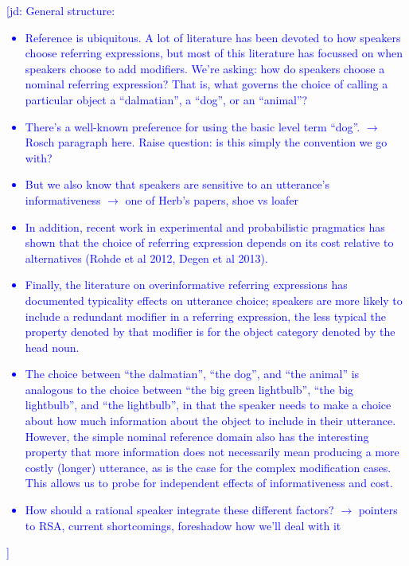 \documentclass[10pt,letterpaper]{article}
\newcommand{\jd}[1]{\textcolor{Blue}{[jd: #1]}}
\begin{document}
\jd{General structure:
\begin{itemize}
	\item Reference is ubiquitous. A lot of literature has been devoted to how speakers choose referring expressions, but most of this literature has focussed on when speakers choose to add modifiers. We're asking: how do speakers choose a nominal referring expression? That is, what governs the choice of calling a particular object a ``dalmatian'', a ``dog'', or an ``animal''?
	\item There's a well-known preference for using the basic level term ``dog''. $\rightarrow$ Rosch paragraph here. Raise question: is this simply the convention we go with?
	\item But we also know that speakers are sensitive to an utterance's informativeness $\rightarrow$ one of Herb's papers, shoe vs loafer
	\item In addition, recent work in experimental and probabilistic pragmatics has shown that the choice of referring expression depends on its cost relative to alternatives (Rohde et al 2012, Degen et al 2013).
	\item Finally, the literature on overinformative referring expressions has documented typicality effects on utterance choice; speakers are more likely to include a redundant modifier in a referring expression, the less typical the property denoted by that modifier is for the object category denoted by the head noun. 
	\item The choice between ``the dalmatian'', ``the dog'', and ``the animal'' is analogous to the choice between ``the big green lightbulb'', ``the big lightbulb'', and ``the lightbulb'', in that the speaker needs to make a choice about how much information about the object to include in their utterance. However, the simple nominal reference domain also has the interesting property that more information does not necessarily mean producing a more costly (longer) utterance, as is the case for the complex modification cases. This allows us to probe for independent effects of informativeness and cost.
	\item How should a rational speaker integrate these different factors? $\rightarrow$ pointers to RSA, current shortcomings, foreshadow how we'll deal with it
\end{itemize}}
\end{document}
